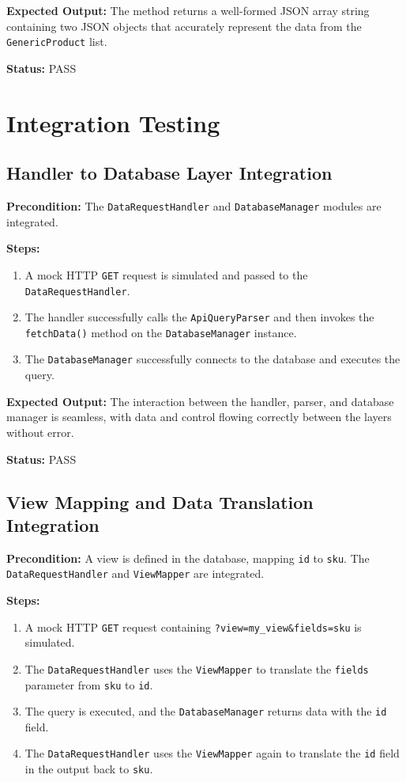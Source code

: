 \documentclass[12pt, a4paper]{report}
\begin{document}
\noindent\textbf{Expected Output:} The method returns a well-formed JSON array string containing two JSON objects that accurately represent the data from the \lstinline|GenericProduct| list.

\noindent\textbf{Status:} PASS

\section{Integration Testing}

\subsection{Handler to Database Layer Integration}

\noindent\textbf{Precondition:} The \lstinline|DataRequestHandler| and \lstinline|DatabaseManager| modules are integrated.

\noindent\textbf{Steps:}
\begin{enumerate}
    \item A mock HTTP \lstinline|GET| request is simulated and passed to the \lstinline|DataRequestHandler|.
    \item The handler successfully calls the \lstinline|ApiQueryParser| and then invokes the \lstinline|fetchData()| method on the \lstinline|DatabaseManager| instance.
    \item The \lstinline|DatabaseManager| successfully connects to the database and executes the query.
\end{enumerate}

\noindent\textbf{Expected Output:} The interaction between the handler, parser, and database manager is seamless, with data and control flowing correctly between the layers without error.

\noindent\textbf{Status:} PASS

\subsection{View Mapping and Data Translation Integration}

\noindent\textbf{Precondition:} A view is defined in the database, mapping \lstinline|id| to \lstinline|sku|. The \lstinline|DataRequestHandler| and \lstinline|ViewMapper| are integrated.

\noindent\textbf{Steps:}
\begin{enumerate}
    \item A mock HTTP \lstinline|GET| request containing \lstinline|?view=my_view&fields=sku| is simulated.
    \item The \lstinline|DataRequestHandler| uses the \lstinline|ViewMapper| to translate the \lstinline|fields| parameter from \lstinline|sku| to \lstinline|id|.
    \item The query is executed, and the \lstinline|DatabaseManager| returns data with the \lstinline|id| field.
    \item The \lstinline|DataRequestHandler| uses the \lstinline|ViewMapper| again to translate the \lstinline|id| field in the output back to \lstinline|sku|.
\end{enumerate}
\end{document}
